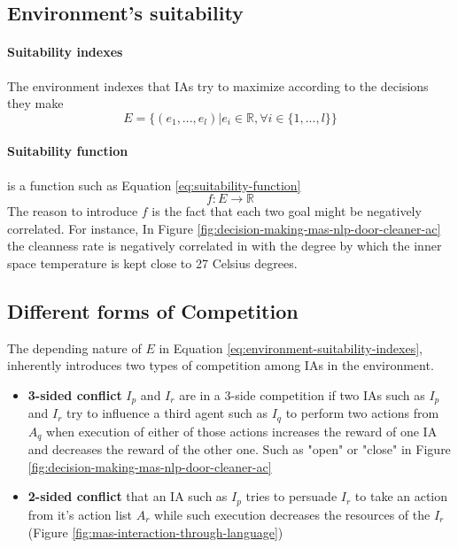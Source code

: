\documentclass{article}
\begin{document}
\begin{multicols}{2}
			\subsection{Environment's suitability}\label{sec:environment-suitability}
				\paragraph{Suitability indexes} The environment indexes that IAs try to maximize according to the decisions they make 
				\begin{equation}
					E = \{(e_1,...,e_l) | e_i \in \mathbb{R} , \forall i \in \{1,...,l\} \} 
					\label{eq:environment-suitability-indexes}
				\end{equation}
				
				\paragraph{Suitability function} is a function such as Equation \ref{eq:suitability-function}
				\begin{equation}
					f: E \rightarrow \mathbb{R}
					\label{eq:suitability-function}
				\end{equation}
				The reason to introduce $f$ is the fact that each two goal might be negatively correlated. For instance, In Figure \ref{fig:decision-making-mas-nlp-door-cleaner-ac} the cleanness rate is negatively correlated in with the degree by which the inner space temperature is kept close to 27 Celsius degrees. 
			
			\subsection{Different forms of Competition}\label{sec:competion-types}
				The depending nature of $E$ in Equation \ref{eq:environment-suitability-indexes}, inherently introduces two types of competition among IAs in the environment. 
				\begin{itemize}
					\item \textbf{3-sided conflict} $I_p$ and $I_r$ are in a 3-side competition if two IAs such as $I_p$ and $I_r$ try to influence a third agent such as $I_q$ to perform two actions from $A_q$ when execution of either of those actions increases the reward of one IA and decreases the reward of the other one. Such as "open" or "close" in Figure \ref{fig:decision-making-mas-nlp-door-cleaner-ac}
					
					\item \textbf{2-sided conflict} that an IA such as $I_p$ tries to persuade $I_r$ to take an action from it's action list $A_r$ while such execution decreases the resources of the $I_r$ (Figure \ref{fig:mas-interaction-through-language})
				\end{itemize}	
				

\end{multicols}
\end{document}
